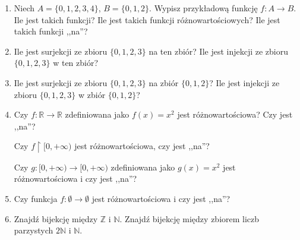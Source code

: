 \documentclass[12pt]{article}
\newcommand{\isfunc}[3]{{{#1}\colon{#2}\rightarrow{#3}}}
\newcommand{\bN}{\mathbb{N}}
\newcommand{\bbZ}{\mathbb{Z}}
\newcommand{\bR}{\mathbb{R}}
\newcommand{\restricted}{{\upharpoonright}}
\begin{document}
\begin{enumerate}
\item Niech $A=\{0,1,2,3,4\}$, $B=\{0,1,2\}$.
Wypisz przykładową funkcję $\isfunc{f}{A}{B}$.
Ile jest takich funkcji? Ile jest takich funkcji różnowartościowych?
Ile jest takich funkcji ,,na''? 

\item 
Ile jest surjekcji ze zbioru $\{0,1,2,3\}$ na ten zbiór?
Ile jest injekcji ze zbioru $\{0,1,2,3\}$ w ten zbiór?

\item 
Ile jest surjekcji ze zbioru $\{0,1,2,3\}$ na zbiór $\{0,1,2\}$?
Ile jest injekcji ze zbioru $\{0,1,2,3\}$ w zbiór $\{0,1,2\}$?

\item 
Czy $\isfunc{f}{\bR}{\bR}$ zdefiniowana jako $f(x)=x^2$ 
jest różnowartościowa? Czy jest ,,na''?

Czy $f\restricted [0,+\infty)$ jest różnowartościowa, czy jest ,,na''?

Czy $\isfunc{g}{[0,+\infty)}{[0,+\infty)}$ zdefiniowana jako 
$g(x)=x^2$ jest różnowartościowa i czy jest ,,na''?

\item 
Czy funkcja $\isfunc{f}{\emptyset}{\emptyset}$ jest różnowartościowa
i czy jest ,,na''?

\item 
Znajdź bijekcję między $\bbZ$ i $\bN$.
Znajdź bijekcję między zbiorem liczb parzystych $2\bN$ i $\bN$.

\end{enumerate}
\end{document}
